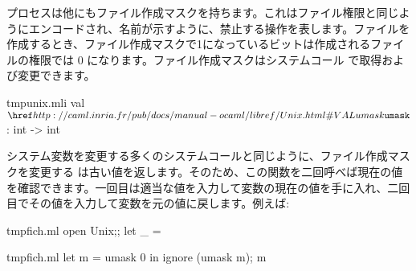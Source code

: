 プロセスは他にもファイル作成マスクを持ちます。これはファイル権限と同じようにエンコードされ、名前が示すように、禁止する操作を表します。ファイルを作成するとき、ファイル作成マスクで1になっているビットは作成されるファイルの権限では 0 になります。ファイル作成マスクはシステムコール  で取得および変更できます。
%
\begin{listingcodefile}{tmpunix.mli}
val $\libvalue{Unix}{umask}$ : int -> int
\end{listingcodefile}
%
システム変数を変更する多くのシステムコールと同じように、ファイル作成マスクを変更する  は古い値を返します。そのため、この関数を二回呼べば現在の値を確認できます。一回目は適当な値を入力して変数の現在の値を手に入れ、二回目でその値を入力して変数を元の値に戻します。例えば:
%
\begin{codefile}{tmpfich.ml}
open Unix;;
let _ =
\end{codefile}
%
\begin{listingcodefile}{tmpfich.ml}
let m = umask 0 in ignore (umask m); m
\end{listingcodefile}

